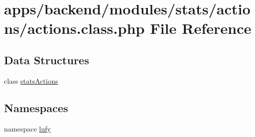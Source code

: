 \hypertarget{backend_2modules_2stats_2actions_2actions_8class_8php}{\section{apps/backend/modules/stats/actions/actions.class.\-php File Reference}
\label{backend_2modules_2stats_2actions_2actions_8class_8php}
}
\subsection*{Data Structures}
\begin{DoxyCompactItemize}
\item 
class \hyperlink{classstats_actions}{stats\-Actions}
\end{DoxyCompactItemize}
\subsection*{Namespaces}
\begin{DoxyCompactItemize}
\item 
namespace \hyperlink{namespacelufy}{lufy}
\end{DoxyCompactItemize}
